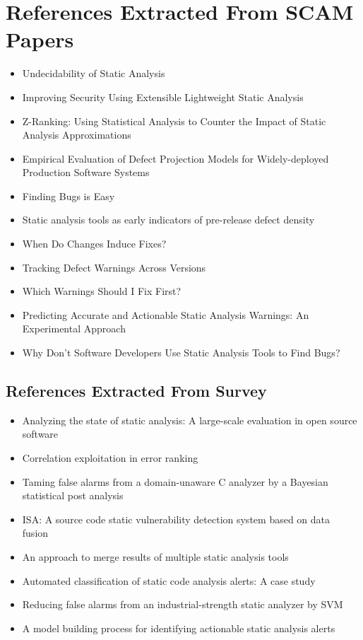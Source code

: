 \section{References Extracted From SCAM Papers}
\label{apx:sec:refs}
\begin{itemize}
\item Undecidability of Static Analysis~\cite{landi_undecidability_1992}
\item Improving Security Using Extensible Lightweight Static Analysis~\cite{evans_improving_2002}
\item Z-Ranking: Using Statistical Analysis to Counter the Impact of Static Analysis Approximations~\cite{kremenek2003z}
\item Empirical Evaluation of Defect Projection Models for Widely-deployed Production Software Systems~\cite{li2004empirical}
\item Finding Bugs is Easy~\cite{hovemeyer_finding_2004}
\item Static analysis tools as early indicators of pre-release defect density~\cite{nagappan2005static}
\item When Do Changes Induce Fixes?~\cite{sliwerski2005changes}
\item Tracking Defect Warnings Across Versions~\cite{spacco_tracking_2006}
\item Which Warnings Should I Fix First?~\cite{kim_which_2007}
\item Predicting Accurate and Actionable Static Analysis Warnings: An Experimental Approach~\cite{ruthruff_predicting_2008}
\item Why Don’t Software Developers Use Static Analysis Tools to Find Bugs?~\cite{johnson_why_2013}
\end{itemize}

\subsection{References Extracted From Survey}
\label{apx:sec:survey}
\begin{itemize}
  \item Analyzing the state of static analysis: A large-scale evaluation in open source software~\cite{beller2016analyzing}
  \item Correlation exploitation in error ranking~\cite{kremenek2004correlation}
  \item Taming false alarms from a domain-unaware C analyzer by a Bayesian statistical post analysis~\cite{jung2005taming}
  \item ISA: A source code static vulnerability detection system based on data fusion~\cite{kong2007isa}
  \item An approach to merge results of multiple static analysis tools~\cite{meng2008approach}
  \item Automated classification of static code analysis alerts: A case study~\cite{yuksel2013classification}
  \item Reducing false alarms from an industrial-strength static analyzer by SVM~\cite{yoon2014reducing}
  \item A model building process for identifying actionable static analysis alerts~\cite{heckman2009model}
\end{itemize}
